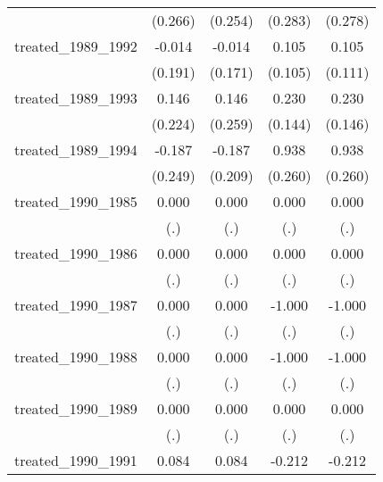 {\begin{tabular}{l*{4}{c}}
            &     (0.266)         &     (0.254)         &     (0.283)         &     (0.278)         \\
[1em]
treated\_1989\_1992&      -0.014         &      -0.014         &       0.105         &       0.105         \\
            &     (0.191)         &     (0.171)         &     (0.105)         &     (0.111)         \\
[1em]
treated\_1989\_1993&       0.146         &       0.146         &       0.230         &       0.230         \\
            &     (0.224)         &     (0.259)         &     (0.144)         &     (0.146)         \\
[1em]
treated\_1989\_1994&      -0.187         &      -0.187         &       0.938\sym{***}&       0.938\sym{***}\\
            &     (0.249)         &     (0.209)         &     (0.260)         &     (0.260)         \\
[1em]
treated\_1990\_1985&       0.000         &       0.000         &       0.000         &       0.000         \\
            &         (.)         &         (.)         &         (.)         &         (.)         \\
[1em]
treated\_1990\_1986&       0.000         &       0.000         &       0.000         &       0.000         \\
            &         (.)         &         (.)         &         (.)         &         (.)         \\
[1em]
treated\_1990\_1987&       0.000         &       0.000         &      -1.000         &      -1.000         \\
            &         (.)         &         (.)         &         (.)         &         (.)         \\
[1em]
treated\_1990\_1988&       0.000         &       0.000         &      -1.000         &      -1.000         \\
            &         (.)         &         (.)         &         (.)         &         (.)         \\
[1em]
treated\_1990\_1989&       0.000         &       0.000         &       0.000         &       0.000         \\
            &         (.)         &         (.)         &         (.)         &         (.)         \\
[1em]
treated\_1990\_1991&       0.084         &       0.084         &      -0.212         &      -0.212         \\

\end{tabular}}
